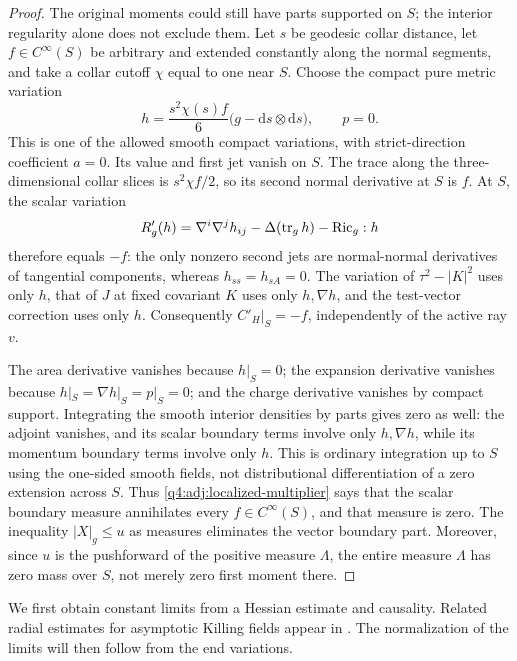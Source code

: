\begin{proof}
The original moments could still have parts supported on $S$; the interior
regularity alone does not exclude them.  Let $s$ be geodesic collar distance,
let $f\in C^\infty(S)$ be arbitrary and extended constantly along the normal
segments, and take a collar cutoff $\chi$ equal to one near $S$.  Choose the
compact pure metric variation
\begin{equation}
 h=\frac{s^2\chi(s)f}{6}\bigl(g-\mathrm ds\otimes\mathrm ds\bigr),
 \qquad p=0.
 \label{q4:adj:boundary-atom-test}
\end{equation}
This is one of the allowed smooth compact variations, with strict-direction
coefficient $a=0$.  Its value and first jet vanish on $S$.  The trace along
the three-dimensional collar slices is $s^2\chi f/2$, so its second normal
derivative at $S$ is $f$.  At $S$, the scalar variation
\[
 R'_g(h)=\nabla^i\nabla^jh_{ij}-\Delta(\operatorname{tr}_gh)-\operatorname{Ric}_g:h
\]
therefore equals $-f$: the only nonzero second jets are normal-normal
derivatives of tangential components, whereas $h_{ss}=h_{sA}=0$.
The variation of $\tau^2-|K|^2$ uses only $h$, that of $J$ at fixed covariant
$K$ uses only $h,\nabla h$, and the test-vector correction uses only $h$.
Consequently $C'_H|_S=-f$, independently of the active ray $v$.

The area derivative vanishes because $h|_S=0$; the expansion derivative
vanishes because $h|_S=\nabla h|_S=p|_S=0$; and the charge derivative
vanishes by compact support.  Integrating the smooth interior densities by
parts gives zero as well: the adjoint vanishes, and its scalar boundary
terms involve only $h,\nabla h$, while its momentum boundary terms involve
only $h$.  This is ordinary integration up to $S$ using the one-sided smooth
fields, not distributional differentiation of a zero extension across $S$.
Thus \eqref{q4:adj:localized-multiplier} says that the scalar boundary measure
annihilates every $f\in C^\infty(S)$, and that measure is zero.
The inequality $|X|_g\le u$ as measures eliminates the vector boundary part.
Moreover, since $u$ is the pushforward of the positive measure $\Lambda$,
the entire measure $\Lambda$ has zero mass over $S$, not merely zero first
moment there.
\end{proof}

We first obtain constant limits from a Hessian estimate and causality.
Related radial estimates for asymptotic Killing fields appear in
\cite[Proposition~2.1 and Appendix~C]{BeigChrusciel1996}.
The normalization of the limits will then follow from the end variations.

